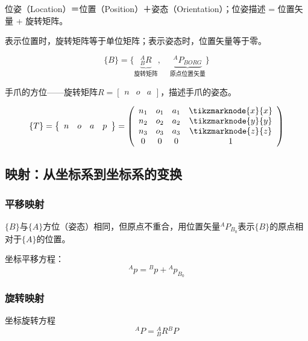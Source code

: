 位姿（Location）＝位置（Position）＋姿态（Orientation）；位姿描述 = 位置矢量 + 旋转矩阵。

表示位置时，旋转矩阵等于单位矩阵；表示姿态时，位置矢量等于零。

$$
\{B\} = \{ \underbrace{{}^{A}_{B}R}_{\text{旋转矩阵}}, \quad \underbrace{{}^{A}P_{BORG}}_{\text{原点位置矢量}} \}
$$

手爪的方位——旋转矩阵$R=\left[\begin{array}{lll}n & o & a\end{array}\right]$，描述手爪的姿态。

$$
\{T\}=\left\{\begin{array}{llll}
n & o & a & p
\end{array}\right\}=
\left(\begin{array}{cccc}
n_1 & o_1 & a_1 & \tikzmarknode{x}{x} \\
n_2 & o_2 & a_2 & \tikzmarknode{y}{y} \\
n_3 & o_3 & a_3 & \tikzmarknode{z}{z} \\
0 & 0 & 0 & 1
\end{array}\right)
$$


\subsection{映射：从坐标系到坐标系的变换}

\subsubsection{平移映射}

\(\{B\}\)与\(\{A\}\)方位（姿态）相同，但原点不重合，用位置矢量${ }^A P_{B_0}$表示\(\{B\}\)的原点相对于\(\{A\}\)的位置。

坐标平移方程：
$$
{ }^A p = { }^B p + { }^A p_{B_0}
$$

\subsubsection{旋转映射}

坐标旋转方程
$$
{ }^A P = { }^A_B R { }^B P
$$

